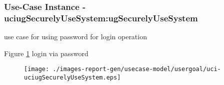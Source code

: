 
	\subsubsection{Use-Case Instance - uciugSecurelyUseSystem:ugSecurelyUseSystem}
	
	use case for using password for login operation		  
	\begin{operationmodel}
	
	\end{operationmodel} 

	
	Figure \ref{fig:lu.uni.lassy.excalibur.examples.icrash-RE-UC-uci-uciugSecurelyUseSystem}
	login via password
	
	\begin{figure}[htbp]
	\begin{center}
	
	\texttt{[image: ./images-report-gen/usecase-model/usergoal/uci-uciugSecurelyUseSystem.eps]}
	\end{center}
	\caption[lu.uni.lassy.excalibur.examples.icrash Sequence Diagram: uci-uciugSecurelyUseSystem]{}
	\label{fig:lu.uni.lassy.excalibur.examples.icrash-RE-UC-uci-uciugSecurelyUseSystem}
	\end{figure}
	\vspace{0.5cm}
